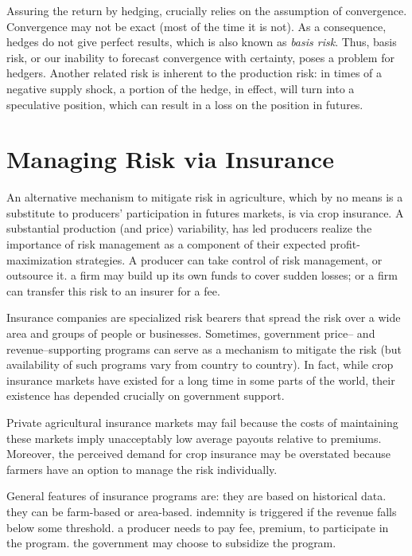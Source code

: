 \documentclass[
]{book}
\begin{document}
Assuring the return by hedging, crucially relies on the assumption of convergence. Convergence may not be exact (most of the time it is not). As a consequence, hedges do not give perfect results, which is also known as \emph{basis risk}. Thus, basis risk, or our inability to forecast convergence with certainty, poses a problem for hedgers. Another related risk is inherent to the production risk: in times of a negative supply shock, a portion of the hedge, in effect, will turn into a speculative position, which can result in a loss on the position in futures.

\hypertarget{managing-risk-via-insurance}{%
\section{Managing Risk via Insurance}\label{managing-risk-via-insurance}}

An alternative mechanism to mitigate risk in agriculture, which by no means is a substitute to producers' participation in futures markets, is via crop insurance. A substantial production (and price) variability, has led producers realize the importance of risk management as a component of their expected profit-maximization strategies. A producer can take control of risk management, or outsource it. a firm may build up its own funds to cover sudden losses; or a firm can transfer this risk to an insurer for a fee.

Insurance companies are specialized risk bearers that spread the risk over a wide area and groups of people or businesses. Sometimes, government price-- and revenue--supporting programs can serve as a mechanism to mitigate the risk (but availability of such programs vary from country to country). In fact, while crop insurance markets have existed for a long time in some parts of the world, their existence has depended crucially on government support.

Private agricultural insurance markets may fail because the costs of maintaining these markets imply unacceptably low average payouts relative to premiums. Moreover, the perceived demand for crop insurance may be overstated because farmers have an option to manage the risk individually.

General features of insurance programs are: they are based on historical data. they can be farm-based or area-based. indemnity is triggered if the revenue falls below some threshold. a producer needs to pay fee, premium, to participate in the program. the government may choose to subsidize the program.
\end{document}
